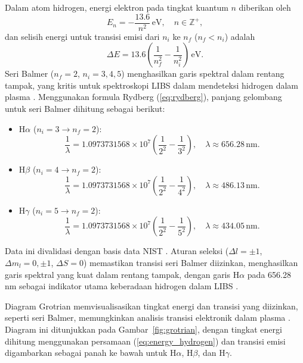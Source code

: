 Dalam atom hidrogen, energi elektron pada tingkat kuantum \( n \) diberikan oleh
\begin{equation}
E_n = -\frac{13.6}{n^2} \, \text{eV}, \quad n \in \mathbb{Z}^+, \label{eq:energy_hydrogen}
\end{equation}
dan selisih energi untuk transisi emisi dari \( n_i \) ke \( n_f \) (\( n_f < n_i \)) adalah
\begin{equation}
\Delta E = 13.6 \left( \frac{1}{n_f^2} - \frac{1}{n_i^2} \right) \, \text{eV}. \label{eq:deltaE}
\end{equation}
Seri Balmer (\( n_f = 2 \), \( n_i = 3, 4, 5 \)) menghasilkan garis spektral dalam rentang tampak, yang kritis untuk spektroskopi LIBS dalam mendeteksi hidrogen dalam plasma \citep{CremersRadzemski2013}. Menggunakan formula Rydberg (\ref{eq:rydberg}), panjang gelombang untuk seri Balmer dihitung sebagai berikut:
\begin{itemize}
    \item H\(\alpha\) (\( n_i = 3 \to n_f = 2 \)):
    \[
    \frac{1}{\lambda} = 1.0973731568 \times 10^7 \left( \frac{1}{2^2} - \frac{1}{3^2} \right), \quad \lambda \approx 656.28 \, \text{nm}.
    \]
    \item H\(\beta\) (\( n_i = 4 \to n_f = 2 \)):
    \[
    \frac{1}{\lambda} = 1.0973731568 \times 10^7 \left( \frac{1}{2^2} - \frac{1}{4^2} \right), \quad \lambda \approx 486.13 \, \text{nm}.
    \]
    \item H\(\gamma\) (\( n_i = 5 \to n_f = 2 \)):
    \[
    \frac{1}{\lambda} = 1.0973731568 \times 10^7 \left( \frac{1}{2^2} - \frac{1}{5^2} \right), \quad \lambda \approx 434.05 \, \text{nm}.
    \]
\end{itemize}
Data ini divalidasi dengan basis data NIST \citep{Kramida2023}. Aturan seleksi (\( \Delta l = \pm 1 \), \( \Delta m_l = 0, \pm 1 \), \( \Delta S = 0 \)) memastikan transisi seri Balmer diizinkan, menghasilkan garis spektral yang kuat dalam rentang tampak, dengan garis H\(\alpha\) pada 656.28 nm sebagai indikator utama keberadaan hidrogen dalam LIBS \citep{CremersRadzemski2013}.

Diagram Grotrian memvisualisasikan tingkat energi dan transisi yang diizinkan, seperti seri Balmer, memungkinkan analisis transisi elektronik dalam plasma \citep{Mason2015}. Diagram ini ditunjukkan pada Gambar~\ref{fig:grotrian}, dengan tingkat energi dihitung menggunakan persamaan (\ref{eq:energy_hydrogen}) dan transisi emisi digambarkan sebagai panah ke bawah untuk H\(\alpha\), H\(\beta\), dan H\(\gamma\).

